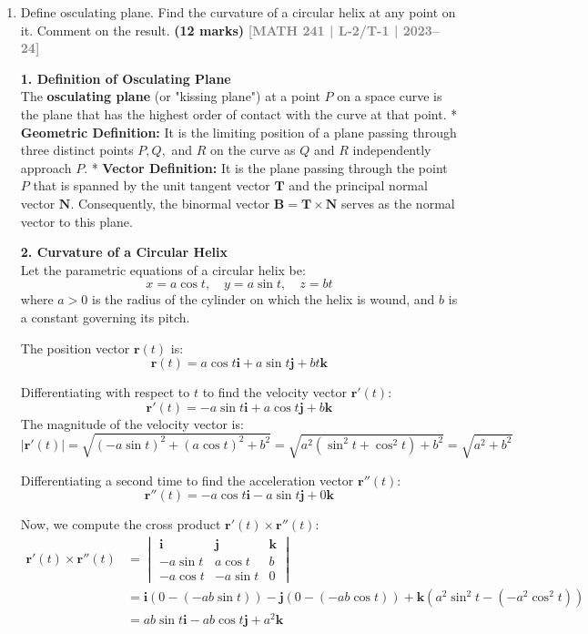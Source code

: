 \documentclass[12pt,a4paper]{article}
\newcommand{\yr}[1]{\hfill\textcolor{gray}{\small\textbf{[#1]}}}
\newcommand{\mk}[1]{\textcolor{orange!70!black}{\small\textbf{(#1 marks)}}}
\begin{document}
\begin{enumerate}


\item Define osculating plane. Find the curvature of a circular helix at any point on it. Comment on the result.
\mk{12} \yr{MATH 241 | L-2/T-1 | 2023--24}

\begin{tcolorbox}[enhanced,breakable,ansbox,colback=cD!4,colframe=cD,boxrule=0.8pt,arc=5pt,title={\textbf{Answer}},fonttitle=\bfseries\color{white},colbacktitle=cD]

\textbf{1. Definition of Osculating Plane} \\
The \textbf{osculating plane} (or "kissing plane") at a point $P$ on a space curve is the plane that has the highest order of contact with the curve at that point. 
* \textbf{Geometric Definition:} It is the limiting position of a plane passing through three distinct points $P, Q,$ and $R$ on the curve as $Q$ and $R$ independently approach $P$.
* \textbf{Vector Definition:} It is the plane passing through the point $P$ that is spanned by the unit tangent vector $\mathbf{T}$ and the principal normal vector $\mathbf{N}$. Consequently, the binormal vector $\mathbf{B} = \mathbf{T} \times \mathbf{N}$ serves as the normal vector to this plane.

\vspace{1em}
\textbf{2. Curvature of a Circular Helix} \\
Let the parametric equations of a circular helix be:
\[ x = a \cos t, \quad y = a \sin t, \quad z = bt \]
where $a > 0$ is the radius of the cylinder on which the helix is wound, and $b$ is a constant governing its pitch.

The position vector $\mathbf{r}(t)$ is:
\[ \mathbf{r}(t) = a \cos t \mathbf{i} + a \sin t \mathbf{j} + bt \mathbf{k} \]

Differentiating with respect to $t$ to find the velocity vector $\mathbf{r}'(t)$:
\[ \mathbf{r}'(t) = -a \sin t \mathbf{i} + a \cos t \mathbf{j} + b \mathbf{k} \]
The magnitude of the velocity vector is:
\[ |\mathbf{r}'(t)| = \sqrt{(-a \sin t)^2 + (a \cos t)^2 + b^2} = \sqrt{a^2(\sin^2 t + \cos^2 t) + b^2} = \sqrt{a^2 + b^2} \]

Differentiating a second time to find the acceleration vector $\mathbf{r}''(t)$:
\[ \mathbf{r}''(t) = -a \cos t \mathbf{i} - a \sin t \mathbf{j} + 0\mathbf{k} \]

Now, we compute the cross product $\mathbf{r}'(t) \times \mathbf{r}''(t)$:
\begin{align*}
    \mathbf{r}'(t) \times \mathbf{r}''(t) &= \begin{vmatrix} 
    \mathbf{i} & \mathbf{j} & \mathbf{k} \\ 
    -a \sin t & a \cos t & b \\ 
    -a \cos t & -a \sin t & 0 
    \end{vmatrix} \\
    &= \mathbf{i}(0 - (-ab \sin t)) - \mathbf{j}(0 - (-ab \cos t)) + \mathbf{k}(a^2 \sin^2 t - (-a^2 \cos^2 t)) \\
    &= ab \sin t \mathbf{i} - ab \cos t \mathbf{j} + a^2 \mathbf{k}
\end{align*}


\end{tcolorbox}
\end{enumerate}
\end{document}
